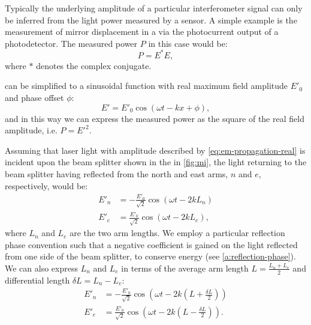 Typically the underlying amplitude of a particular interferometer signal can only be inferred from the light power measured by a sensor. A simple example is the measurement of mirror displacement in a \MI{} via the photocurrent output of a photodetector. The measured power $P$ in this case would be:
\begin{equation}
  P = E^{\ast} E,
\end{equation}
where $\ast$ denotes the complex conjugate.

 can be simplified to a sinusoidal function with real maximum field amplitude $E'_0$ and phase offset $\phi$:
\begin{equation}
  \label{eq:em-propagation-real}
  E' = E'_0 \cos \left( \omega t - kx + \phi \right),
\end{equation}
and in this way we can express the measured power as the square of the real field amplitude, i.e. $P = E'^2$.

Assuming that laser light with amplitude described by \cref{eq:em-propagation-real} is incident upon the beam splitter shown in the \MI{} in \cref{fig:mi}, the light returning to the beam splitter having reflected from the north and east arms, $n$ and $e$, respectively, would be:
\begin{align}
  E'_n &= -\frac{E'_0}{\sqrt{2}} \cos \left( \omega t - 2kL_n \right) \\
  E'_e &= \frac{E'_0}{\sqrt{2}} \cos \left( \omega t - 2kL_e \right),
\end{align}
where $L_n$ and $L_e$ are the two arm lengths. We employ a particular reflection phase convention such that a negative coefficient is gained on the light reflected from one side of the beam splitter, to conserve energy (see \cref{a:reflection-phase}). We can also express $L_n$ and $L_e$ in terms of the average arm length $L = \frac{L_n + L_e}{2}$ and differential length $\delta L = L_n - L_e$:
\begin{align}
  E'_n &= -\frac{E'_0}{\sqrt{2}} \cos \left( \omega t - 2k \left( L + \frac{\delta L}{2} \right) \right) \\
  E'_e &= \frac{E'_0}{\sqrt{2}} \cos \left( \omega t - 2k \left( L - \frac{\delta L}{2} \right) \right).
\end{align}


